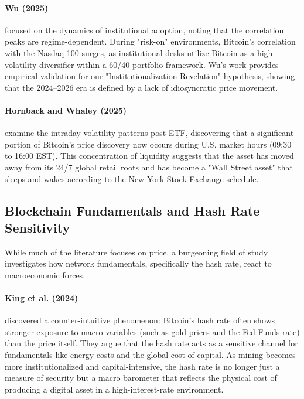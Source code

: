 \documentclass[10pt, conference, compsocconf]{IEEEtran}
\begin{document}
\paragraph{Wu (2025)} focused on the dynamics of institutional adoption, noting that the correlation peaks are regime-dependent. During "risk-on" environments, Bitcoin’s correlation with the Nasdaq 100 surges, as institutional desks utilize Bitcoin as a high-volatility diversifier within a 60/40 portfolio framework. Wu’s work provides empirical validation for our "Institutionalization Revelation" hypothesis, showing that the 2024--2026 era is defined by a lack of idiosyncratic price movement.

\paragraph{Hornback and Whaley (2025)} examine the intraday volatility patterns post-ETF, discovering that a significant portion of Bitcoin's price discovery now occurs during U.S. market hours (09:30 to 16:00 EST). This concentration of liquidity suggests that the asset has moved away from its 24/7 global retail roots and has become a "Wall Street asset" that sleeps and wakes according to the New York Stock Exchange schedule.


\subsection{Blockchain Fundamentals and Hash Rate Sensitivity}

While much of the literature focuses on price, a burgeoning field of study investigates how network fundamentals, specifically the hash rate, react to macroeconomic forces.

\paragraph{King et al. (2024)} discovered a counter-intuitive phenomenon: Bitcoin’s hash rate often shows stronger exposure to macro variables (such as gold prices and the Fed Funds rate) than the price itself. They argue that the hash rate acts as a sensitive channel for fundamentals like energy costs and the global cost of capital. As mining becomes more institutionalized and capital-intensive, the hash rate is no longer just a measure of security but a macro barometer that reflects the physical cost of producing a digital asset in a high-interest-rate environment.
\end{document}
